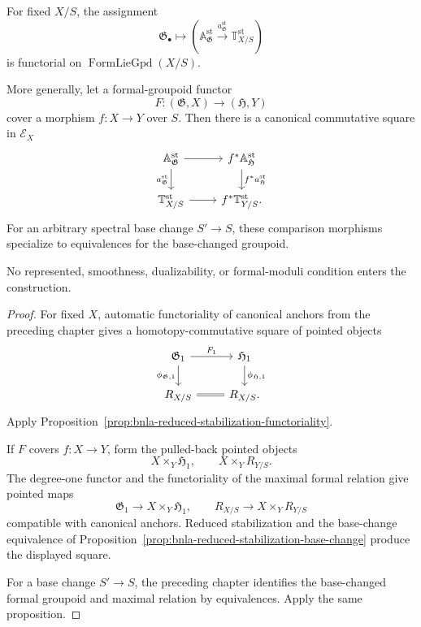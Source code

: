 \begin{theorem}
\label{thm:bnla-intrinsic-stable-differentiation}
For fixed $X/S$, the assignment
\[
    \mathfrak G_\bullet
    \longmapsto
    \left(
        \mathbb A^{\mathrm{st}}_{\mathfrak G}
        \xrightarrow{a^{\mathrm{st}}_{\mathfrak G}}
        \mathbb T^{\mathrm{st}}_{X/S}
    \right)
\]
is functorial on $\operatorname{FormLieGpd}(X/S)$.

More generally, let a formal-groupoid functor
\[
    F:(\mathfrak G,X)\longrightarrow(\mathfrak H,Y)
\]
cover a morphism $f:X\to Y$ over $S$.  Then there is a canonical commutative
square in $\mathcal E_X$
\[
\begin{tikzcd}
\mathbb A^{\mathrm{st}}_{\mathfrak G}
  \arrow[r]
  \arrow[d,"a^{\mathrm{st}}_{\mathfrak G}"'] &
f^*\mathbb A^{\mathrm{st}}_{\mathfrak H}
  \arrow[d,"f^*a^{\mathrm{st}}_{\mathfrak H}"]\\
\mathbb T^{\mathrm{st}}_{X/S}
  \arrow[r] &
f^*\mathbb T^{\mathrm{st}}_{Y/S}.
\end{tikzcd}
\]
For an arbitrary spectral base change $S'\to S$, these comparison morphisms
specialize to equivalences for the base-changed groupoid.

No represented, smoothness, dualizability, or formal-moduli condition enters
the construction.
\end{theorem}

\begin{proof}
For fixed $X$, automatic functoriality of canonical anchors from the preceding
chapter gives a homotopy-commutative square of pointed objects
\[
\begin{tikzcd}
\mathfrak G_1 \arrow[r,"F_1"]
  \arrow[d,"\phi_{\mathfrak G,1}"'] &
\mathfrak H_1 \arrow[d,"\phi_{\mathfrak H,1}"]\\
R_{X/S} \arrow[r,equal] & R_{X/S}.
\end{tikzcd}
\]
Apply Proposition~\ref{prop:bnla-reduced-stabilization-functoriality}.

If $F$ covers $f:X\to Y$, form the pulled-back pointed objects
\[
    X\times_Y\mathfrak H_1,
    \qquad
    X\times_YR_{Y/S}.
\]
The degree-one functor and the functoriality of the maximal formal relation
give pointed maps
\[
    \mathfrak G_1\longrightarrow X\times_Y\mathfrak H_1,
    \qquad
    R_{X/S}\longrightarrow X\times_YR_{Y/S}
\]
compatible with canonical anchors.  Reduced stabilization and the base-change
equivalence of Proposition~\ref{prop:bnla-reduced-stabilization-base-change}
produce the displayed square.

For a base change $S'\to S$, the preceding chapter identifies the
base-changed formal groupoid and maximal relation by equivalences.  Apply the
same proposition.
\end{proof}

